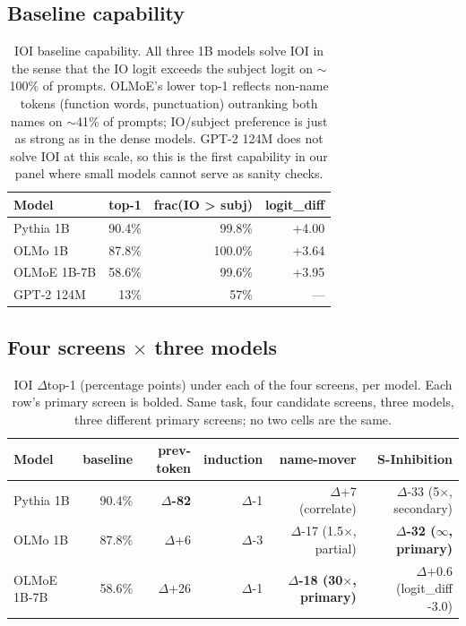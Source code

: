 \documentclass[11pt]{article}
\begin{document}
\subsection{Baseline capability}
\label{sec:ioi-baseline}

\begin{table}[h]
\centering
\small
\begin{tabular}{lrrr}
\toprule
Model & top-1 & frac(IO > subj) & logit\_diff \\
\midrule
Pythia 1B & 90.4\% & 99.8\% & +4.00 \\
OLMo 1B & 87.8\% & 100.0\% & +3.64 \\
OLMoE 1B-7B & 58.6\% & 99.6\% & +3.95 \\
\midrule
GPT-2 124M & 13\% & 57\% & --- \\
\bottomrule
\end{tabular}
\caption{IOI baseline capability. All three 1B models solve IOI in the sense that the IO logit exceeds the subject logit on $\sim$100\% of prompts. OLMoE's lower top-1 reflects non-name tokens (function words, punctuation) outranking both names on $\sim$41\% of prompts; IO/subject preference is just as strong as in the dense models. GPT-2 124M does not solve IOI at this scale, so this is the first capability in our panel where small models cannot serve as sanity checks.}
\label{tab:ioi-baseline}
\end{table}

\subsection{Four screens $\times$ three models}
\label{sec:ioi-four-screens}

\begin{table}[h]
\centering
\small
\begin{tabular}{lrrrrr}
\toprule
Model & baseline & prev-token & induction & name-mover & S-Inhibition \\
\midrule
Pythia 1B & 90.4\% & \textbf{$\Delta$-82} & $\Delta$-1 & $\Delta$+7 (correlate) & $\Delta$-33 (5$\times$, secondary) \\
OLMo 1B & 87.8\% & $\Delta$+6 & $\Delta$-3 & $\Delta$-17 (1.5$\times$, partial) & \textbf{$\Delta$-32 ($\infty$, primary)} \\
OLMoE 1B-7B & 58.6\% & $\Delta$+26 & $\Delta$-1 & \textbf{$\Delta$-18 (30$\times$, primary)} & $\Delta$+0.6 (logit\_diff -3.0) \\
\bottomrule
\end{tabular}
\caption{IOI $\Delta$top-1 (percentage points) under each of the four screens, per model. Each row's primary screen is bolded. Same task, four candidate screens, three models, three different primary screens; no two cells are the same.}
\label{tab:ioi-grid}
\end{table}
\end{document}
